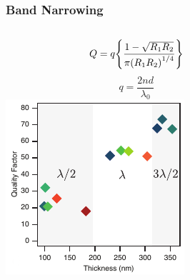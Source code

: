 \documentclass{beamer}
\begin{document}
\begin{frame}
\begin{columns}
\begin{column}{0.6\textwidth}
                \end{column}
            \end{columns}
        \end{frame}
        
        \begin{frame}
            \frametitle{Band Narrowing}
            \begin{columns}
                \begin{column}{0.4\textwidth}
					\centering
					$$Q=q\qty{\frac{1-\sqrt{R_1R_2}}{\pi\qty(R_1R_2)^{1/4}}}$$
					$$q=\frac{2nd}{\lambda_0}$$
					\includegraphics[width=\textwidth]{images/n1_quality_factor.png}
                \end{column}
                \begin{column}{0.6\textwidth}
					\centering

\end{column}
\end{columns}
\end{frame}
\end{document}
